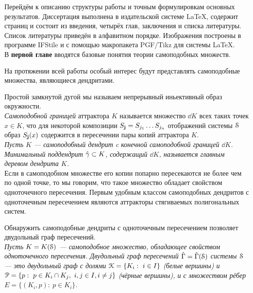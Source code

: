 Перейдём к описанию структуры работы и точным формулировкам основных результатов.
Диссертация выполнена в издательской системе \LaTeX, содержит \red{\pageref{LastPage}} страниц и состоит из введения, четырёх глав, заключения и списка литературы.
Список литературы приведён в алфавитном порядке.
Изображения построены в программе IFStile и с помощью макропакета PGF/Tikz для системы \LaTeX.\\


В \textbf{первой главе} вводятся базовые понятия теории самоподобных множеств.


На протяжении всей работы особый интерес будут представлять самоподобные множества, являющиеся дендритами. 


Простой замкнутой дугой мы называем непрерывный иньективный образ окружности.\\

{\em Самоподобной границей} аттрактора $K$ называется множество $\dd K$ всех таких точек $x\in K$, что для некоторой композиции $S_{\bf{j}}=S_{j_1}\ldots S_{j_n}$ отображений системы ${\EuScript S}$ образ $S_{\bf{j}}(x)$ содержится в пересечении пары копий аттрактора $K$.\\

{\em Пусть $K$ --- самоподобный дендрит c конечной самоподобной границей $\dd K$.
Минимальный поддендрит $\hat\gamma\subset K$, содержащий $\dd K$, называется {\em главным деревом} дендрита $K$.}\\

Если в самоподобном множестве его копии попарно пересекаются не более чем по одной точке, то мы говорим, что такое множество обладает свойством одноточечного пересечения.
Первым удобным классом самоподобных дендритов с одноточечным пересечением являются аттракторы стягиваемых полигональных систем.



Обнаружить самоподобные дендриты с одноточечным пересечением позволяет двудольный граф пересечений.\\

{\em Пусть $K=K({\EuScript S})$ --- самоподобное множество, обладающее свойством одноточечного пересечения.
{\em Двудольный граф пересечений} $\hat\Gamma=\hat\Gamma({\EuScript S})$ системы ${\EuScript S}$ --- это двудольный граф с долями ${\EuScript K}=\{K_i:\ i\in I\}$ (белые вершины) и ${\EuScript P}=\{p:\ p\in K_i\cap K_j,\ i,j\in I, i\neq j\}$ (чёрные вершины), и с множеством рёбер $E=\{(K_i,p):\ p\in K_i\}$.}\\

